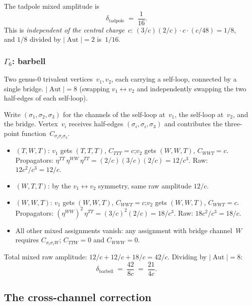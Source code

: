 \documentclass[11pt]{article}
\theoremstyle{plain}
\theoremstyle{definition}
\theoremstyle{remark}
\DeclareMathOperator{\Aut}{Aut}
\begin{document}
\noindent The tadpole mixed amplitude is
\begin{equation}\label{eq:tadpole-cross}
 \delta_{\mathrm{tadpole}}
 \;=\; \frac{1}{16}.
\end{equation}
This is \emph{independent of the central charge~$c$}:
$(3/c)(2/c) \cdot c \cdot (c/48) = 1/8$, and $1/8$
divided by $|\Aut| = 2$ is~$1/16$.

\subsubsection*{$\Gamma_6$: barbell}

Two genus-$0$ trivalent vertices~$v_1, v_2$, each carrying a
self-loop, connected by a single bridge.
$|\Aut| = 8$ (swapping $v_1 \leftrightarrow v_2$ and
independently swapping the two half-edges of each self-loop).

Write $(\sigma_1, \sigma_2, \sigma_3)$ for the channels of
the self-loop at~$v_1$, the self-loop at~$v_2$, and the bridge.
Vertex~$v_i$ receives half-edges $(\sigma_i, \sigma_i, \sigma_3)$
and contributes the three-point function~$C_{\sigma_i \sigma_i \sigma_3}$.

\begin{itemize}
\item $(T,W,T)$: $v_1$ gets $(T,T,T)$,
 $C_{TTT} = c$;\enspace $v_2$ gets $(W,W,T)$,
 $C_{WWT} = c$.
 Propagators: $\eta^{TT}\,\eta^{WW}\,\eta^{TT}
 = (2/c)(3/c)(2/c) = 12/c^3$.
 Raw: $12 c^2/c^3 = 12/c$.

\item $(W,T,T)$: by the $v_1 \leftrightarrow v_2$ symmetry,
 same raw amplitude $12/c$.

\item $(W,W,T)$: $v_1$ gets $(W,W,T)$,
 $C_{WWT} = c$;\enspace $v_2$ gets $(W,W,T)$,
 $C_{WWT} = c$.
 Propagators: $(\eta^{WW})^2\,\eta^{TT}
 = (3/c)^2(2/c) = 18/c^3$.
 Raw: $18c^2/c^3 = 18/c$.

\item All other mixed assignments vanish:
 any assignment with bridge channel~$W$ requires
 $C_{\sigma_i \sigma_i W}$;\enspace
 $C_{TTW} = 0$ and $C_{WWW} = 0$.
\end{itemize}
Total mixed raw amplitude: $12/c + 12/c + 18/c = 42/c$.
Dividing by $|\Aut| = 8$:
\begin{equation}\label{eq:barbell-cross}
 \delta_{\mathrm{barbell}}
 \;=\; \frac{42}{8c}
 \;=\; \frac{21}{4c}.
\end{equation}


\subsection{The cross-channel correction}
\end{document}
